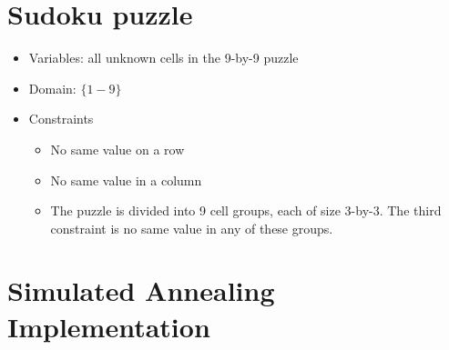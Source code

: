 \documentclass[a4paper, 12pt]{article}
\begin{document}
\section{Sudoku puzzle}

\begin{itemize}
    \item Variables: all unknown cells in the 9-by-9 puzzle

	\item Domain: $\{1-9\}$

    \item Constraints
    \begin{itemize}
        \item No same value on a row
        \item No same value in a column
        \item The puzzle is divided into 9 cell groups, each of size 3-by-3. The
        third constraint is no same value in any of these groups.
    \end{itemize}
\end{itemize}

\section{Simulated Annealing Implementation}
\end{document}
